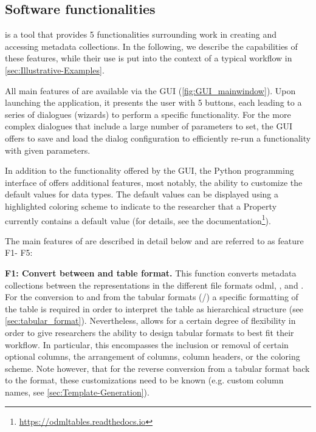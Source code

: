 \subsection{Software functionalities}
\label{sec:software_functionalities} 

 is a tool that provides 5 functionalities surrounding work in creating and accessing metadata collections. In the following, we describe the capabilities of these features, while their use is put into the context of a typical workflow in \cref{sec:Illustrative-Examples}.

All main features of  are available via the  GUI (\cref{fig:GUI_mainwindow}). Upon launching the application, it presents the user with 5 buttons, each leading to a series of dialogues (wizards) to perform a specific  functionality. For the more complex dialogues that include a large number of parameters to set, the GUI offers to save and load the dialog configuration to efficiently re-run a functionality with given parameters. 

In addition to the functionality offered by the GUI, the Python programming interface of  offers additional features, most notably, the ability to customize the default values for  data types. The default values can be displayed using a highlighted coloring scheme to indicate to the researcher that a Property currently contains a default value (for details, see the  documentation\footnote{\url{https://odmltables.readthedocs.io}}).

\def\fconvert{F1}
\def\fgenerate{F2} 
\def\fcompare{F3}
\def\fmerge{F4}
\def\ffilter{F5} 

The main features of  are described in detail below and are referred to as feature \fconvert - \ffilter:


\textbf{\fconvert: Convert between  and table format.}
This function converts metadata collections between the representations in the different file formats odml, , and . For the conversion to and from the tabular formats (/) a specific formatting of the table is required in order to interpret the table as hierarchical  structure (see \cref{sec:tabular_format}). Nevertheless,  allows for a certain degree of flexibility in order to give researchers the ability to design tabular formats to best fit their workflow. In particular, this encompasses the inclusion or removal of certain optional columns, the arrangement of columns, column headers, or the coloring scheme. Note however, that for the reverse conversion from a tabular format back to the  format, these customizations need to be known (e.g. custom column names, see \cref{sec:Template-Generation}).

